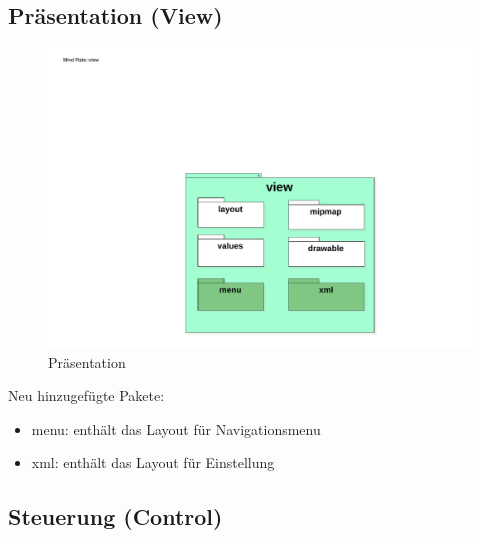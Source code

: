 \documentclass[a4paper]{scrreprt}
\begin{document}
            \subsection{Präsentation (View)}                    
                
                \begin{figure}[H]
                        \centering
                        \includegraphics[scale = 1.0]{View.pdf}
                        \caption{Präsentation}
                \end{figure}

                Neu hinzugefügte Pakete:
                \begin{itemize}
                    \item menu: enthält das Layout für Navigationsmenu
                    \item xml: enthält das Layout für Einstellung
                \end{itemize}

            \subsection{Steuerung (Control)}
\end{document}
